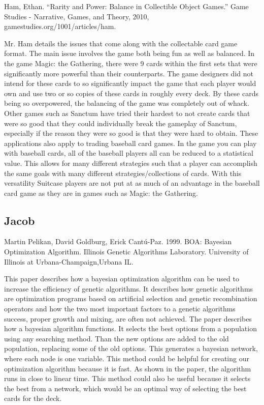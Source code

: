 \documentclass[12pt, letterpaper]{article}
\begin{document}
Ham, Ethan.
\enquote{Rarity and Power: Balance in Collectible Object Games.}
Game Studies - Narrative, Games, and Theory, 2010,
gamestudies.org/1001/articles/ham.

Mr. Ham details the issues that come along with the collectable card game format. The main issue involves the game both
being fun as well as balanced. In the game Magic: the Gathering, there were 9 cards within the first sets that were
significantly more powerful than their counterparts. The game designers did not intend for these cards to so
significantly impact the game that each player would own and use two or so copies of these cards in roughly every deck.
By these cards being so overpowered, the balancing of the game was completely out of whack. Other games such as Sanctum
have tried their hardest to not create cards that were so good that they could individually break the gameplay of
Sanctum, especially if the reason they were so good is that they were hard to obtain. These applications also apply to
trading baseball card games. In the game you can play with baseball cards, all of the baseball players all can be
reduced to a statistical value. This allows for many different strategies such that a player can accomplish the same
goals with many different strategies/collections of cards. With this versatility Suitcase players are not put at as much
of an advantage in the baseball card game as they are in games such as Magic: the Gathering.

\subsection{Jacob}

Martin Pelikan, David Goldburg, Erick Cantú-Paz. 1999. BOA: Bayesian Optimization Algorithm. Illinois Genetic Algorithms
Laboratory. University of Illinois at Urbana-Champaign,Urbana IL.

This paper describes how a bayesian optimization algorithm can be used to increase the efficiency of genetic algorithms.
It describes how genetic algorithms are optimization programs based on artificial selection and genetic recombination
operators and how the two most important factors to a genetic algorithms success, proper growth and mixing, are often
not achieved. The paper describes how a bayesian algorithm functions. It selects the best options from a population
using any searching method. Than the new options are added to the old population, replacing some of the old options.
This generates a bayesian network, where each node is one variable. This method could be helpful for creating our
optimization algorithm because it is fast. As shown in the paper, the algorithm runs in close to linear time. This
method could also be useful because it selects the best from a network, which would be an optimal way of selecting the
best cards for the deck.
\end{document}
